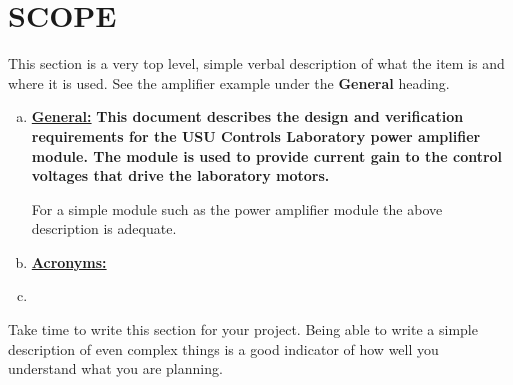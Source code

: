\section{SCOPE}

\begin{slshape}
\color{blue} 
This section is a very top level, simple verbal description of what the item is and where it is used.   See the amplifier example under the \textbf{General} heading.
\bigskip
\end{slshape}


\begin{enumerate}[(a)]
	\item \textbf{\underline{General:}} \textbf{This document describes the design and verification requirements for the USU Controls Laboratory power amplifier module.  The module is used to provide current gain to the control voltages that drive the laboratory motors.}
\bigskip

\begin{slshape}
\color{blue}
	For a simple module such as the power amplifier module the above description is adequate. 
\end{slshape}
\bigskip


	\item \textbf{\underline{Acronyms:}}\begin{slshape} \color{blue}{I have not chosen to define acronyms because I have a thing about the overuse of acronyms.  You may not be so burdened and find that typing out a name is simply too tedious.  Put those acronyms here.}\end{slshape}
	\item \begin{slshape} \color{blue}{Additional short descriptive paragraphs can be added only if 
	needed for special classification, designation of alternate versions or 
	other material that is part of a top-level description.}\end{slshape}
\end{enumerate}

\begin{slshape}
\color{blue}
\StopSign  Take time to write this section for your project.  Being able to write a simple description of even complex things is a good indicator of how well you understand what you are planning.
\end{slshape}